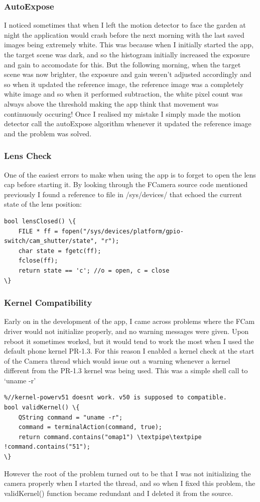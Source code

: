 {{\subsubsection{AutoExpose}\label{autoexpose}
I noticed sometimes that when I left the motion detector to face the garden at night the application would crash before the next morning with the last saved images being extremely white. This was because when I initially started the app, the target scene was dark, and so the histogram initially increased the exposure and gain to accomodate for this. But the following morning, when the target scene was now brighter, the exposure and gain weren’t adjusted accordingly and so when it updated the reference image, the reference image was a completely white image and so when it performed subtraction, the white pixel count was always above the threshold making the app think that movement was continuously occuring!
Once I realised my mistake I simply made the motion detector call the autoExpose algorithm whenever it updated the reference image and the problem was solved.

\subsubsection{Lens Check}
One of the easiest errors to make when using the app is to forget to open the lens cap before starting it. By looking through the FCamera source code mentioned previously I found a reference to file in /sys/devices/ that echoed the current state of the lens position:
\begin{lstlisting}
bool lensClosed() \{
    FILE * ff = fopen("/sys/devices/platform/gpio-switch/cam_shutter/state", "r");
    char state = fgetc(ff);
    fclose(ff);
    return state == 'c'; //o = open, c = close
\}
\end{lstlisting}

\subsubsection{Kernel Compatibility}
Early on in the development of the app, I came across problems where the FCam driver would not initialize properly, and no warning messages were given. Upon reboot it sometimes worked, but it would tend to work the most when I used the default phone kernel PR-1.3.
For this reason I enabled a kernel check at the start of the Camera thread which would issue out a warning whenever a kernel different from the PR-1.3 kernel was being used. This was a simple shell call to ‘uname -r’
\begin{lstlisting}
%//kernel-powerv51 doesnt work. v50 is supposed to compatible.
bool validKernel() \{
    QString command = "uname -r";
    command = terminalAction(command, true);
    return command.contains("omap1") \textpipe\textpipe !command.contains("51");
\}
\end{lstlisting}
 However the root of the problem turned out to be that I was not initializing the camera properly when I started the thread, and so when I fixed this problem, the validKernel() function became redundant and I deleted it from the source.

}}
